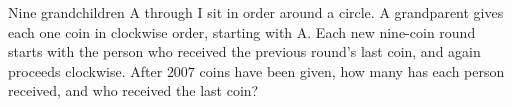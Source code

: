 Nine grandchildren A through I sit in order around a circle. A grandparent gives each one coin in clockwise order, starting with A. Each new nine-coin round starts with the person who received the previous round's last coin, and again proceeds clockwise. After $2007$ coins have been given, how many has each person received, and who received the last coin?
